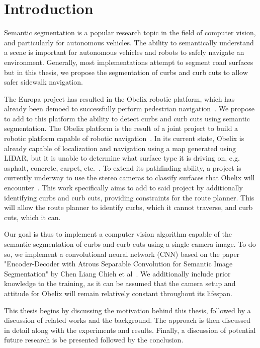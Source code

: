 \chapter{Introduction}\label{chap:introduction}
Semantic segmentation is a popular research topic in the field of computer vision, and particularly for autonomous vehicles.
The ability to semantically understand a scene is important for autonomous vehicles and robots to safely navigate an environment.
Generally, most implementations attempt to segment road surfaces but in this thesis, we propose the segmentation of curbs and curb cuts to allow safer sidewalk navigation.

The Europa project has resulted in the Obelix robotic platform, which has already been demoed to successfully perform pedestrian navigation~\cite{europa}\cite{obelix-slam}.
We propose to add to this platform the ability to detect curbs and curb cuts using semantic segmentation.
The Obelix platform is the result of a joint project to build a robotic platform capable of robotic navigation~\cite{europa}. 
In its current state, Obelix is already capable of localization and navigation using a map generated using LIDAR, but it is unable to determine what surface type it is driving on, e.g. asphalt, concrete, carpet, etc.~\cite{jannik}.
To extend its pathfinding ability, a project is currently underway to use the stereo cameras to classify surfaces that Obelix will encounter~\cite{jannik}.
This work specifically aims to add to said project by additionally identifying curbs and curb cuts, providing constraints for the route planner.
This will allow the route planner to identify curbs, which it cannot traverse, and curb cuts, which it can.



Our goal is thus to implement a computer vision algorithm capable of the semantic segmentation of curbs and curb cuts using a single camera image.
To do so, we implement a convolutional neural network (CNN) based on the paper "Encoder-Decoder with Atrous Separable Convolution for Semantic Image Segmentation" by Chen Liang Chieh et al~\cite{deeplab}.
We additionally include prior knowledge to the training, as it can be assumed that the camera setup and attitude for Obelix will remain relatively constant throughout its lifespan.

This thesis begins by discussing the motivation behind this thesis, followed by a discussion of related works and the background.
The approach is then discussed in detail along with the experiments and results.
Finally, a discussion of potential future research is be presented followed by the conclusion.
